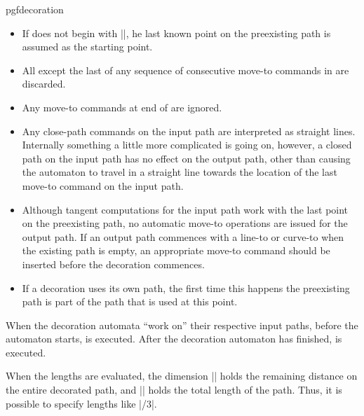 \begin{environment}{{pgfdecoration}}
  \begin{itemize}
  \item
    If  does not begin with
    |\pgfpathmoveto|,	he last known point on the preexisting path is
    assumed as the starting point.
  \item
    All except the last of any sequence of consecutive move-to commands
    in  are discarded.
  \item
    Any move-to commands at end of  are
    ignored.
  \item
    Any close-path commands on the input path are interpreted as
    straight lines.
    Internally something a little more complicated is going on,
    however, a closed path on the input path has no effect on the
    output path, other than causing the automaton to travel in a
    straight line towards the location of the last move-to command on
    the input path.
  \item
    Although tangent computations for the input path work with the
    last point on the preexisting path, no automatic move-to
    operations are issued for the output path.
    If an output path commences with a line-to or curve-to when the
    existing path is empty, an appropriate move-to command should be
    inserted before the decoration commences.
  \item
    If a decoration uses its own path, the first time this happens the
    preexisting path is part of the path that is used at this point.
  \end{itemize}

  When the decoration automata ``work on'' their respective input
  paths, before the automaton starts,  is
  executed. After the decoration automaton has finished,  is executed.

\begin{codeexample}[]
\end{codeexample}

  When the lengths are evaluated, the dimension
  |\pgfdecoratedremainingdistance| holds the remaining distance on
  the entire decorated path, and |\pgfdecoratedpathlength| holds the
  total length of the path. Thus, it is possible to specify lengths
  like |\pgfdecoratedpathlength/3|.


\end{environment}
